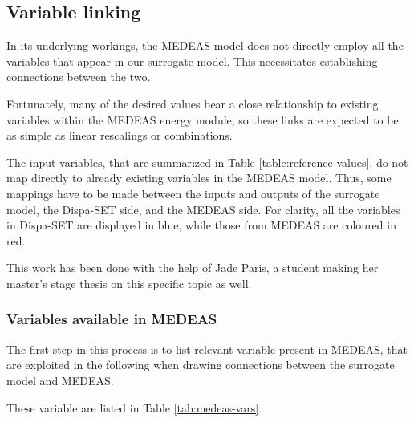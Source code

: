 \subsection{Variable linking}

In its underlying workings, the MEDEAS model does not directly employ all the variables that appear in our surrogate model. This necessitates establishing connections between the two.

Fortunately, many of the desired values bear a close relationship to existing variables within the MEDEAS energy module, so these links are expected to be as simple as linear rescalings or combinations.

The input variables, that are summarized in Table \ref{table:reference-values}, do not map directly to already existing variables in the MEDEAS model. Thus, some mappings have to be made between the inputs and outputs of the surrogate model, the Dispa-SET side, and the MEDEAS side. For clarity, all the variables in Dispa-SET are displayed in blue, while those from MEDEAS are coloured in red.

This work has been done with the help of Jade Paris, a student making her master's stage thesis on this specific topic as well.

\subsubsection{Variables available in MEDEAS}

The first step in this process is to list relevant variable present in MEDEAS, that are exploited in the following when drawing connections between the surrogate model and MEDEAS.

These variable are listed in Table \ref{tab:medeas-vars}.

